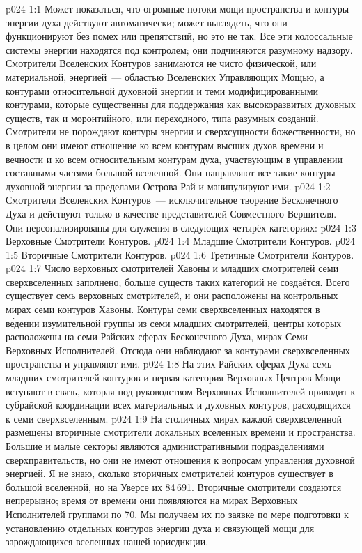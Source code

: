 \vs p024 1:1 Может показаться, что огромные потоки мощи пространства и контуры энергии духа действуют автоматически; может выглядеть, что они функционируют без помех или препятствий, но это не так. Все эти колоссальные системы энергии находятся под контролем; они подчиняются разумному надзору. Смотрители Вселенских Контуров занимаются не чисто физической, или материальной, энергией~--- областью Вселенских Управляющих Мощью, а контурами относительной духовной энергии и теми модифицированными контурами, которые существенны для поддержания как высокоразвитых духовных существ, так и моронтийного, или переходного, типа разумных созданий. Смотрители не порождают контуры энергии и сверхсущности божественности, но в целом они имеют отношение ко всем контурам высших духов времени и вечности и ко всем относительным контурам духа, участвующим в управлении составными частями большой вселенной. Они направляют все такие контуры духовной энергии за пределами Острова Рай и манипулируют ими.
\vs p024 1:2 \pc Смотрители Вселенских Контуров~--- исключительное творение Бесконечного Духа и действуют только в качестве представителей Совместного Вершителя. Они персонализированы для служения в следующих четырёх категориях:
\vs p024 1:3 Верховные Смотрители Контуров.
\vs p024 1:4 Младшие Смотрители Контуров.
\vs p024 1:5 Вторичные Смотрители Контуров.
\vs p024 1:6 Третичные Смотрители Контуров.
\vs p024 1:7 \pc Число верховных смотрителей Хавоны и младших смотрителей семи сверхвселенных заполнено; больше существ таких категорий не создаётся. Всего существует семь верховных смотрителей, и они расположены на контрольных мирах семи контуров Хавоны. Контуры семи сверхвселенных находятся в в\'едении изумительной группы из семи младших смотрителей, центры которых расположены на семи Райских сферах Бесконечного Духа, мирах Семи Верховных Исполнителей. Отсюда они наблюдают за контурами сверхвселенных пространства и управляют ими.
\vs p024 1:8 На этих Райских сферах Духа семь младших смотрителей контуров и первая категория Верховных Центров Мощи вступают в связь, которая под руководством Верховных Исполнителей приводит к субрайской координации всех материальных и духовных контуров, расходящихся к семи сверхвселенным.
\vs p024 1:9 На столичных мирах каждой сверхвселенной размещены вторичные смотрители локальных вселенных времени и пространства. Большие и малые секторы являются административными подразделениями сверхправительств, но они не имеют отношения к вопросам управления духовной энергией. Я не знаю, сколько вторичных смотрителей контуров существует в большой вселенной, но на Уверсе их 84\,691. Вторичные смотрители создаются непрерывно; время от времени они появляются на мирах Верховных Исполнителей группами по 70. Мы получаем их по заявке по мере подготовки к установлению отдельных контуров энергии духа и связующей мощи для зарождающихся вселенных нашей юрисдикции.
